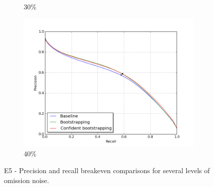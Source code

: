 \begin{figure}[H]
\begin{subfigure}{0.31\textwidth}
\caption{ 30\%} \label{fig:app_E5_3_pr}
\vspace{0.2cm} %
\end{subfigure}
\hspace*{\fill} %
\begin{subfigure}{0.31\textwidth}
\includegraphics[width=\textwidth]{figs/E5/pr_4.png}
\caption{40\%} \label{fig:app_E5_4_pr}
\vspace{0.2cm} %
\end{subfigure}
\caption{E5 - Precision and recall breakeven comparisons for several levels of omission noise.} \label{fig:E5_all_pr}
\end{figure}

